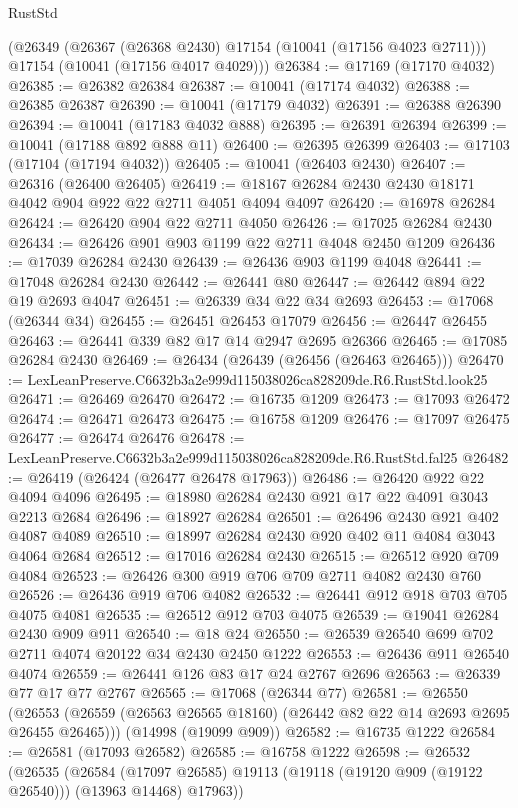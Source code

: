 \begin{lexlean}{RustStd}
\begin{coremodule}
    (@26349
      (@26367 (@26368 @2430) @17154 (@10041 (@17156 @4023 @2711)))
      @17154
      (@10041 (@17156 @4017 @4029)))
@26384 := @17169 (@17170 @4032)
@26385 := @26382 @26384
@26387 := @10041 (@17174 @4032)
@26388 := @26385 @26387
@26390 := @10041 (@17179 @4032)
@26391 := @26388 @26390
@26394 := @10041 (@17183 @4032 @888)
@26395 := @26391 @26394
@26399 := @10041 (@17188 @892 @888 @11)
@26400 := @26395 @26399
@26403 := @17103 (@17104 (@17194 @4032))
@26405 := @10041 (@26403 @2430)
@26407 := @26316 (@26400 @26405)
@26419 := @18167 @26284 @2430 @2430 @18171 @4042 @904 @922 @22 @2711 @4051 @4094 @4097
@26420 := @16978 @26284
@26424 := @26420 @904 @22 @2711 @4050
@26426 := @17025 @26284 @2430
@26434 := @26426 @901 @903 @1199 @22 @2711 @4048 @2450 @1209
@26436 := @17039 @26284 @2430
@26439 := @26436 @903 @1199 @4048
@26441 := @17048 @26284 @2430
@26442 := @26441 @80
@26447 := @26442 @894 @22 @19 @2693 @4047
@26451 := @26339 @34 @22 @34 @2693
@26453 := @17068 (@26344 @34)
@26455 := @26451 @26453 @17079
@26456 := @26447 @26455
@26463 := @26441 @339 @82 @17 @14 @2947 @2695 @26366
@26465 := @17085 @26284 @2430
@26469 := @26434 (@26439 (@26456 (@26463 @26465)))
@26470 := LexLeanPreserve.C6632b3a2e999d115038026ca828209de.R6.RustStd.look25
@26471 := @26469 @26470
@26472 := @16735 @1209
@26473 := @17093 @26472
@26474 := @26471 @26473
@26475 := @16758 @1209
@26476 := @17097 @26475
@26477 := @26474 @26476
@26478 := LexLeanPreserve.C6632b3a2e999d115038026ca828209de.R6.RustStd.fal25
@26482 := @26419 (@26424 (@26477 @26478 @17963))
@26486 := @26420 @922 @22 @4094 @4096
@26495 := @18980 @26284 @2430 @921 @17 @22 @4091 @3043 @2213 @2684
@26496 := @18927 @26284
@26501 := @26496 @2430 @921 @402 @4087 @4089
@26510 := @18997 @26284 @2430 @920 @402 @11 @4084 @3043 @4064 @2684
@26512 := @17016 @26284 @2430
@26515 := @26512 @920 @709 @4084
@26523 := @26426 @300 @919 @706 @709 @2711 @4082 @2430 @760
@26526 := @26436 @919 @706 @4082
@26532 := @26441 @912 @918 @703 @705 @4075 @4081
@26535 := @26512 @912 @703 @4075
@26539 := @19041 @26284 @2430 @909 @911
@26540 := @18 @24
@26550 := @26539 @26540 @699 @702 @2711 @4074 @20122 @34 @2430 @2450 @1222
@26553 := @26436 @911 @26540 @4074
@26559 := @26441 @126 @83 @17 @24 @2767 @2696
@26563 := @26339 @77 @17 @77 @2767
@26565 := @17068 (@26344 @77)
@26581 := @26550
    (@26553 (@26559 (@26563 @26565 @18160) (@26442 @82 @22 @14 @2693 @2695 @26455 @26465)))
    (@14998 (@19099 @909))
@26582 := @16735 @1222
@26584 := @26581 (@17093 @26582)
@26585 := @16758 @1222
@26598 := @26532
    (@26535
      (@26584 (@17097 @26585) @19113 (@19118 (@19120 @909 (@19122 @26540))) (@13963 @14468) @17963))

\end{coremodule}
\end{lexlean}
